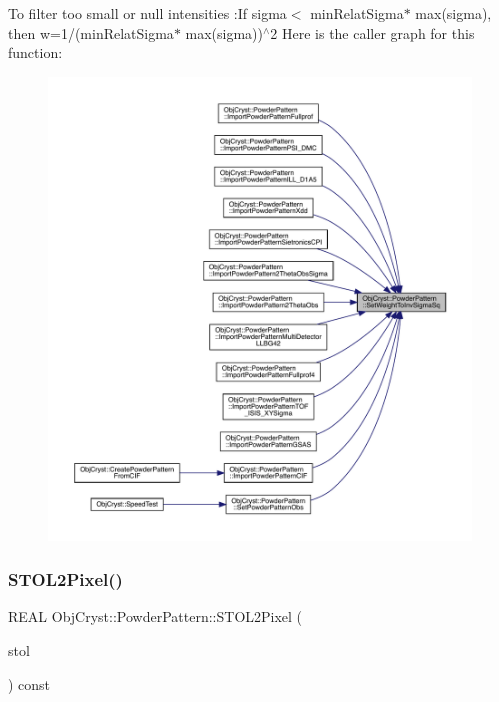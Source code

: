 To filter too small or null intensities \+:If sigma$<$ min\+Relat\+Sigma$\ast$ max(sigma), then w=1/(min\+Relat\+Sigma$\ast$ max(sigma))$^\wedge$2 Here is the caller graph for this function\+:
\nopagebreak
\begin{figure}[H]
\begin{center}
\leavevmode
\includegraphics[width=350pt]{class_obj_cryst_1_1_powder_pattern_add7d97cdb7610f7553b95c2eeefcd172_icgraph}
\end{center}
\end{figure}
\mbox{\label{class_obj_cryst_1_1_powder_pattern_ab479aca62d7dd2742442229474423a02}} 
\subsubsection{\texorpdfstring{STOL2Pixel()}{STOL2Pixel()}}
{\footnotesize\ttfamily R\+E\+AL Obj\+Cryst\+::\+Powder\+Pattern\+::\+S\+T\+O\+L2\+Pixel (\begin{DoxyParamCaption}\item[{const R\+E\+AL}]{stol }\end{DoxyParamCaption}) const}

